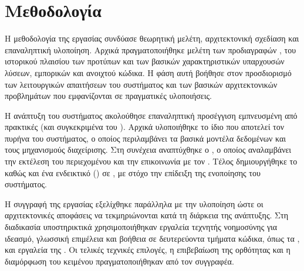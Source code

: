 \section{Μεθοδολογία}

Η μεθοδολογία της εργασίας συνδύασε θεωρητική μελέτη, αρχιτεκτονική σχεδίαση και επαναληπτική υλοποίηση. Αρχικά πραγματοποιήθηκε 
μελέτη των προδιαγραφών , του ιστορικού πλαισίου των προτύπων  και των βασικών χαρακτηριστικών υπαρχουσών λύσεων, 
εμπορικών και ανοιχτού κώδικα. Η φάση αυτή βοήθησε στον προσδιορισμό των λειτουργικών απαιτήσεων του συστήματος και των βασικών αρχιτεκτονικών
προβλημάτων που εμφανίζονται σε πραγματικές υλοποιήσεις.

Η ανάπτυξη του συστήματος ακολούθησε επαναληπτική προσέγγιση εμπνευσμένη από πρακτικές  (και συγκεκριμένα του ).
Αρχικά υλοποιήθηκε το ίδιο  που αποτελεί τον πυρήνα του συστήματος, ο οποίος περιλαμβάνει τα βασικά μοντέλα δεδομένων και τους μηχανισμούς διαχείρισης.
Στη συνέχεια αναπτύχθηκε ο , ο οποίος αναλαμβάνει την εκτέλεση του περιεχομένου και την επικοινωνία με τον .
Τέλος δημιουργήθηκε το  καθώς και ένα ενδεικτικό 
() σε , με στόχο την επίδειξη της ενοποίησης του συστήματος.

Η συγγραφή της εργασίας εξελίχθηκε παράλληλα με την υλοποίηση ώστε οι αρχιτεκτονικές αποφάσεις να τεκμηριώνονται κατά τη διάρκεια της ανάπτυξης.
Στη διαδικασία υποστηρικτικά χρησιμοποιήθηκαν εργαλεία τεχνητής νοημοσύνης για ιδεασμό, γλωσσική επιμέλεια και βοήθεια σε δευτερεύοντα τμήματα
κώδικα, όπως τα ,  και εργαλεία της . Οι τελικές τεχνικές επιλογές, 
η επιβεβαίωση της ορθότητας και η διαμόρφωση του κειμένου πραγματοποιήθηκαν από τον συγγραφέα.
